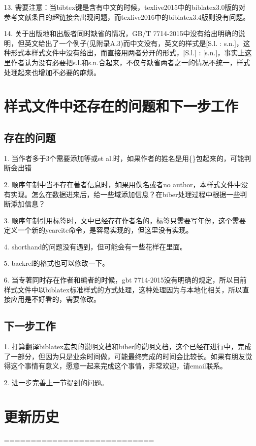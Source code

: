 \documentclass[11pt]{article} %
\begin{document}
13. 需要注意：当bibtex键是含有中文的时候，texlive2015中的biblatex3.0版的对参考文献条目的超链接会出现问题，而texlive2016中的biblatex3.4版则没有问题。

14. 关于出版地和出版者同时缺省的情况，GB/T 7714-2015中没有给出明确的说明，但英文给出了一个例子(见附录A.3)而中文没有，英文的样式是[S.l. : s.n.]，这种形式本样式文件中没有给出，而直接用两者分开的形式，[S.l.] : [s.n.]，事实上这里作者认为没有必要把s.l.和s.n.合起来，不仅与缺省两者之一的情况不统一，样式处理起来也增加不必要的麻烦。

\section{样式文件中还存在的问题和下一步工作}
\subsection{存在的问题}

1. 当作者多于3个需要添加等或et al.时，如果作者的姓名是用\{\}包起来的，可能判断会出错

2. 顺序年制中当不存在著者信息时，如果用佚名或者no author，本样式文件中没有实现。怎么在数据进来后，给一些域添加信息？在biber处理过程中根据一些判断添加信息？

3. 顺序年制引用标签时，文中已经存在作者名的，标签只需要写年份，这个需要定义一个新的yearcite命令，是容易实现的，但这里没有实现。

4. shorthand的问题没有遇到，但可能会有一些花样在里面。

5. backref的格式也可以修改一下。

6. 当专著同时存在作者和编者的时候，gbt 7714-2015没有明确的规定，所以目前样式文件中以biblatex标准样式的方式处理，这种处理因为与本地化相关，所以直接应用是不好看的，需要修改。

\subsection{下一步工作}

1. 打算翻译biblatex宏包的说明文档和biber的说明文档，这个已经在进行中，完成了一部分，但因为只是业余时间做，可能最终完成的时间会比较长。如果有朋友觉得这个事情有意义，愿意一起来完成这个事情，非常欢迎，请email联系。

2. 进一步完善上一节提到的问题。


\section{更新历史}
============================
\end{document}
